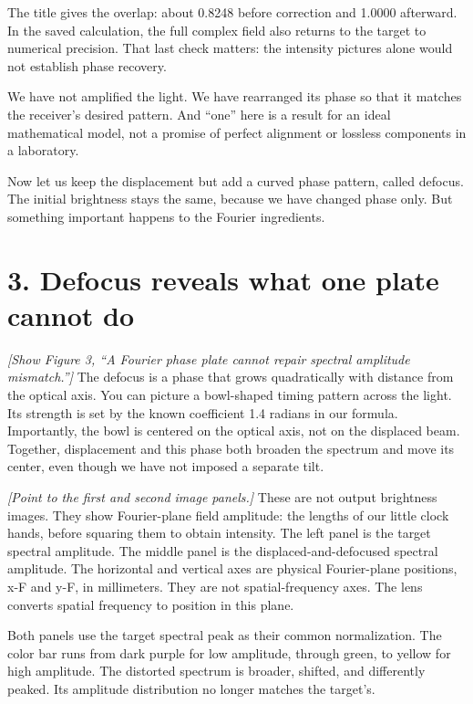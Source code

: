 \documentclass[11pt,a4paper]{article}
\newcommand{\cue}[1]{{\small\color{blue!55!black}\textit{[#1]}}}
\newcommand{\asset}[1]{{\small\texttt{\detokenize{#1}}}}
\begin{document}
The title gives the overlap: about 0.8248 before correction and 1.0000 afterward. In the saved calculation, the full complex field also returns to the target to numerical precision. That last check matters: the intensity pictures alone would not establish phase recovery.

We have not amplified the light. We have rearranged its phase so that it matches the receiver's desired pattern. And ``one'' here is a result for an ideal mathematical model, not a promise of perfect alignment or lossless components in a laboratory.

Now let us keep the displacement but add a curved phase pattern, called defocus. The initial brightness stays the same, because we have changed phase only. But something important happens to the Fourier ingredients.

\newpage
\section*{3. Defocus reveals what one plate cannot do}
\asset{03_spectral_amplitude_limit.png}

\cue{Show Figure 3, ``A Fourier phase plate cannot repair spectral amplitude mismatch.''}
The defocus is a phase that grows quadratically with distance from the optical axis. You can picture a bowl-shaped timing pattern across the light. Its strength is set by the known coefficient 1.4 radians in our formula. Importantly, the bowl is centered on the optical axis, not on the displaced beam. Together, displacement and this phase both broaden the spectrum and move its center, even though we have not imposed a separate tilt.

\cue{Point to the first and second image panels.}
These are not output brightness images. They show Fourier-plane field amplitude: the lengths of our little clock hands, before squaring them to obtain intensity. The left panel is the target spectral amplitude. The middle panel is the displaced-and-defocused spectral amplitude. The horizontal and vertical axes are physical Fourier-plane positions, x-F and y-F, in millimeters. They are not spatial-frequency axes. The lens converts spatial frequency to position in this plane.

Both panels use the target spectral peak as their common normalization. The color bar runs from dark purple for low amplitude, through green, to yellow for high amplitude. The distorted spectrum is broader, shifted, and differently peaked. Its amplitude distribution no longer matches the target's.
\end{document}
